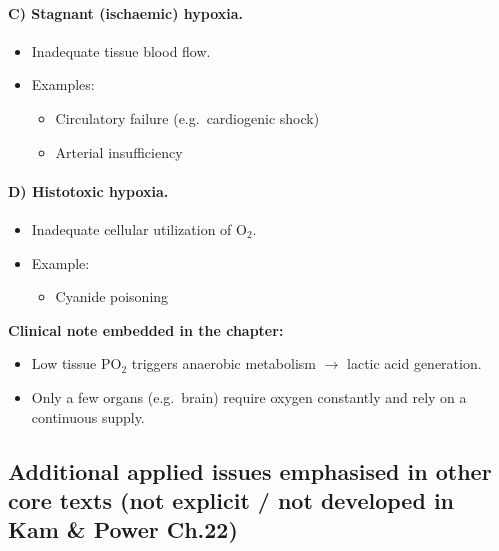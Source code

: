 \documentclass[11pt,a4paper]{article}
\begin{document}
\paragraph{C) Stagnant (ischaemic) hypoxia.}
\begin{itemize}
  \item Inadequate tissue blood flow.
  \item Examples:
  \begin{itemize}
    \item Circulatory failure (e.g.\ cardiogenic shock)
    \item Arterial insufficiency
  \end{itemize}
\end{itemize}

\paragraph{D) Histotoxic hypoxia.}
\begin{itemize}
  \item Inadequate cellular utilization of O$_2$.
  \item Example:
  \begin{itemize}
    \item Cyanide poisoning
  \end{itemize}
\end{itemize}

\textbf{Clinical note embedded in the chapter:}
\begin{itemize}
  \item Low tissue PO$_2$ triggers anaerobic metabolism $\rightarrow$ lactic acid generation.
  \item Only a few organs (e.g.\ brain) require oxygen constantly and rely on a continuous supply.
\end{itemize}

\subsection{Additional applied issues emphasised in other core texts (not explicit / not developed in Kam \& Power Ch.22)}
\end{document}
